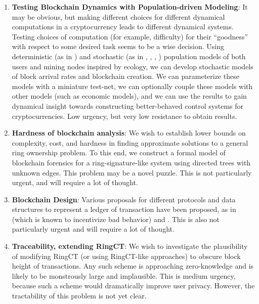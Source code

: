 \documentclass[12pt,english]{mrl}
\theoremstyle{definition}
\numberwithin{equation}{section}
\numberwithin{figure}{section}
\numberwithin{equation}{section}
\numberwithin{equation}{section}
\numberwithin{figure}{section}
\begin{document}
\begin{enumerate}[1.]
    \item \textbf{Testing Blockchain Dynamics with Population-driven Modeling}: It may be obvious, but making different choices for different dynamical computations in a cryptocurrency leads to different dynamical systems. Testing choices of computation (for example, difficulty) for their ``goodness'' with respect to some desired task seems to be a wise decision. Using deterministic (as in \cite{strogatz2014nonlinear}) and stochastic (as in \cite{doob1942topics}, \cite{doob1945markoff}, \cite{gillespie1977exact}, \cite{gillespie1976general}) population models  of both users and mining nodes inspired by ecology, we can develop stochastic models of block arrival rates and blockchain creation. We can parameterize these models with a miniature test-net, we can optionally couple these models with other models (such as economic models), and we can use the results to gain dynamical insight towards constructing better-behaved control systems for cryptocurrencies. Low urgency, but very low resistance to obtain results.
    
    
    

    \item \textbf{Hardness of blockchain analysis}:   We wish to establish lower bounds on complexity, cost, and hardness in finding approximate solutions to a general ring ownership problem.  To this end, we construct a formal model of blockchain forensics for a ring-signature-like system using directed trees with unknown edges. This problem may be a novel puzzle. This is not particularly urgent, and will require a lot of thought.
    
    \item \textbf{Blockchain Design}:  Various proposals for different protocols and data structures to represent a ledger of transaction have been proposed, as in \cite{sompolinsky2013accelerating} (which is known to incentivize bad behavior) and \cite{mcElrathBraid}. This is also not particularly urgent and will require a lot of thought.
    
    
    \item \textbf{Traceability, extending RingCT}: We wish to investigate the plausibility of modifying RingCT (or using RingCT-like approaches) to obscure block height of transactions. Any such scheme is approaching zero-knowledge and is likely to be monstrously large and implausible. This is medium urgency, because such a scheme would dramatically improve user privacy. However, the tractability of this problem is not yet clear.


\end{enumerate}
\end{document}
